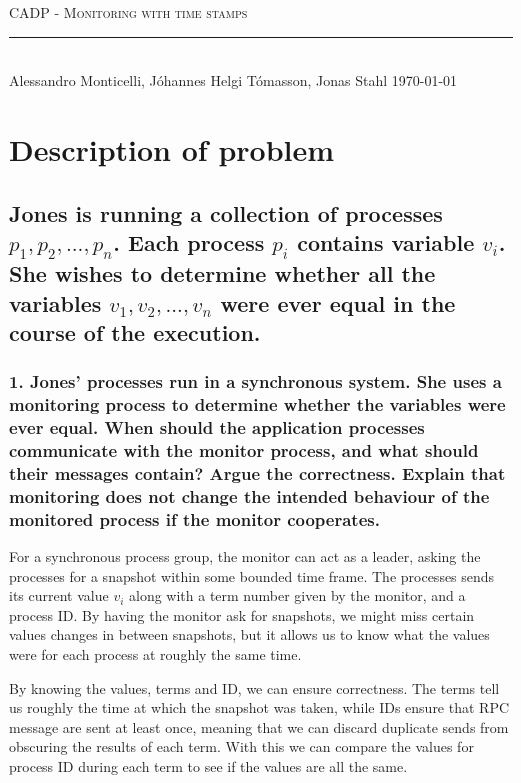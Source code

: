 \documentclass[a4paper,11pt]{article}
\newcommand{\linia}{\rule{\linewidth}{0.5pt}}
\begin{document}
\begin{center}
\vspace{2ex}
{\huge \textsc{CADP - Monitoring with time stamps}}
\vspace{1ex}
\\
\linia\\
Alessandro Monticelli, Jóhannes Helgi Tómasson, Jonas Stahl \hfill \today %
\vspace{4ex}
\end{center}

\section*{Description of problem}
\subsection*{Jones is running a collection of processes $p_1, p_2, ..., p_n$. Each process $p_i$ contains variable $v_i$. She wishes to determine whether all the variables $v_1, v_2, ..., v_n$ were ever equal in the course of the execution.}

\subsubsection*{1. Jones’ processes run in a synchronous system. She uses a monitoring process to determine whether the variables were ever equal. When should the application processes communicate with the monitor process, and what should their messages contain? Argue the correctness. Explain that monitoring does not change the intended behaviour of the monitored process if the monitor cooperates.}
For a synchronous process group, the monitor can act as a leader, asking the processes for a snapshot within some bounded time frame. The processes sends its current value $v_i$ along with a term number given by the monitor, and a process ID. By having the monitor ask for snapshots, we might miss certain values changes in between snapshots, but it allows us to know what the values were for each process at roughly the same time. 

By knowing the values, terms and ID, we can ensure correctness. The terms tell us roughly the time at which the snapshot was taken, while IDs ensure that RPC message are sent at least once, meaning that we can discard duplicate sends from obscuring the results of each term. With this we can compare the values for process ID during each term to see if the values are all the same.
\end{document}
